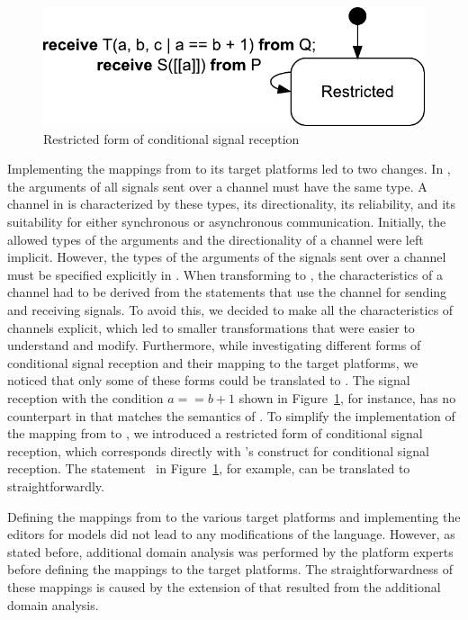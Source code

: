 \begin{figure}[hbt]
  \centering
  \includegraphics[scale=.40]{iterative-dsl-evolution/figs/cond_promela}
  \caption{Restricted form of conditional signal reception}
  \label{fig:iterative-dsl-evolution:cond_promela}
\end{figure}

Implementing the mappings from \SLCO to its target platforms led to two changes.
In \SLCO, the arguments of all signals sent over a channel must have the same type.
A channel in \SLCO is characterized by these types, its directionality, its reliability, and its suitability for either synchronous or asynchronous communication.
Initially, the allowed types of the arguments and the directionality of a channel were left implicit.
However, the types of the arguments of the signals sent over a channel must be specified explicitly in \Promela.
When transforming \SLCO to \Promela, the characteristics of a channel had to be derived from the statements that use the channel for sending and receiving signals.
To avoid this, we decided to make all the characteristics of channels explicit, which led to smaller transformations that were easier to understand and modify.
Furthermore, while investigating different forms of conditional signal reception and their mapping to the target platforms, we noticed that only some of these forms could be translated to \Promela.
The signal reception with the condition $a == b + 1$ shown in Figure~\ref{fig:iterative-dsl-evolution:cond_promela}, for instance, has no counterpart in \Promela that matches the semantics of \SLCO.
To simplify the implementation of the mapping from \SLCO to \Promela, we introduced a restricted form of conditional signal reception, which corresponds directly with \Promela's construct for conditional signal reception.
The statement~ in Figure~\ref{fig:iterative-dsl-evolution:cond_promela}, for example, can be translated to \Promela straightforwardly.

Defining the mappings from \SLCO to the various target platforms and implementing the editors for \SLCO models did not lead to any modifications of the language.
However, as stated before, additional domain analysis was performed by the platform experts before defining the mappings to the target platforms.
The straightforwardness of these mappings is caused by the extension of \SLCO that resulted from the additional domain analysis.

